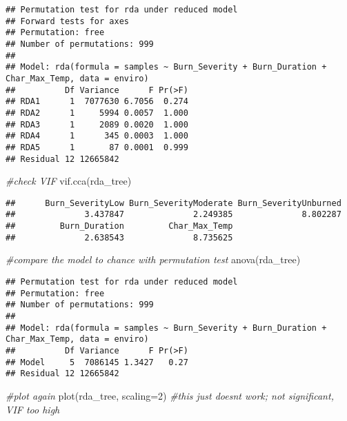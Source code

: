\documentclass[
]{article}
\newenvironment{Shaded}{\begin{snugshade}}{\end{snugshade}}
\newcommand{\AttributeTok}[1]{\textcolor[rgb]{0.77,0.63,0.00}{#1}}
\newcommand{\CommentTok}[1]{\textcolor[rgb]{0.56,0.35,0.01}{\textit{#1}}}
\newcommand{\DecValTok}[1]{\textcolor[rgb]{0.00,0.00,0.81}{#1}}
\newcommand{\FunctionTok}[1]{\textcolor[rgb]{0.00,0.00,0.00}{#1}}
\newcommand{\NormalTok}[1]{#1}
\begin{document}
\begin{verbatim}
## Permutation test for rda under reduced model
## Forward tests for axes
## Permutation: free
## Number of permutations: 999
## 
## Model: rda(formula = samples ~ Burn_Severity + Burn_Duration + Char_Max_Temp, data = enviro)
##          Df Variance      F Pr(>F)
## RDA1      1  7077630 6.7056  0.274
## RDA2      1     5994 0.0057  1.000
## RDA3      1     2089 0.0020  1.000
## RDA4      1      345 0.0003  1.000
## RDA5      1       87 0.0001  0.999
## Residual 12 12665842
\end{verbatim}

\begin{Shaded}
\begin{Highlighting}[]
\CommentTok{\#check VIF}
\FunctionTok{vif.cca}\NormalTok{(rda\_tree)}
\end{Highlighting}
\end{Shaded}

\begin{verbatim}
##      Burn_SeverityLow Burn_SeverityModerate Burn_SeverityUnburned 
##              3.437847              2.249385              8.802287 
##         Burn_Duration         Char_Max_Temp 
##              2.638543              8.735625
\end{verbatim}

\begin{Shaded}
\begin{Highlighting}[]
\CommentTok{\#compare the model to chance with permutation test}
\FunctionTok{anova}\NormalTok{(rda\_tree)}
\end{Highlighting}
\end{Shaded}

\begin{verbatim}
## Permutation test for rda under reduced model
## Permutation: free
## Number of permutations: 999
## 
## Model: rda(formula = samples ~ Burn_Severity + Burn_Duration + Char_Max_Temp, data = enviro)
##          Df Variance      F Pr(>F)
## Model     5  7086145 1.3427   0.27
## Residual 12 12665842
\end{verbatim}

\begin{Shaded}
\begin{Highlighting}[]
\CommentTok{\#plot again}
\FunctionTok{plot}\NormalTok{(rda\_tree, }\AttributeTok{scaling=}\DecValTok{2}\NormalTok{) }\CommentTok{\#this just doesn\textquotesingle{}t work; not significant, VIF too high}
\end{Highlighting}
\end{Shaded}
\end{document}
